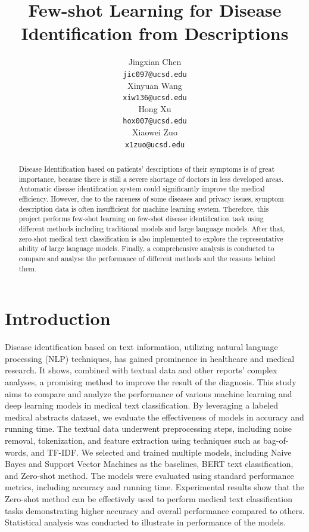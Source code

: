 \documentclass[11pt,a4paper]{article}
\title{Few-shot Learning for Disease Identification from Descriptions}
\author{Jingxian Chen \\
  {\tt jic097@ucsd.edu} \\\And
  Xinyuan Wang \\
  {\tt xiw136@ucsd.edu} \\\And
  Hong Xu \\
  {\tt hox007@ucsd.edu} \\\And
  Xiaowei Zuo \\
  {\tt x1zuo@ucsd.edu} \\}
\date{}
\begin{document}
\maketitle

\begin{abstract}
Disease Identification based on patients' descriptions of their symptoms is of great importance, because there is still a severe shortage of doctors in less developed areas. Automatic disease identification system could significantly improve the medical efficiency. However, due to the rareness of some diseases and privacy issues, symptom description data is often insufficient for machine learning system. Therefore, this project performs few-shot learning on few-shot disease identification task using different methods including traditional models and large language models. After that, zero-shot medical text classification is also implemented to explore the representative ability of large language models. Finally, a comprehensive analysis is conducted to compare and analyse the performance of different methods and the reasons behind them.
\end{abstract}

\section{Introduction}

Disease identification based on text information, utilizing natural language processing (NLP) techniques, has gained prominence in healthcare and medical research. It shows, combined with textual data and other reports' complex analyses, a promising method to improve the result of the diagnosis. This study aims to compare and analyze the performance of various machine learning and deep learning models in medical text classification. By leveraging a labeled medical abstracts dataset, we evaluate the effectiveness of models in accuracy and running time. The textual data underwent preprocessing steps, including noise removal, tokenization, and feature extraction using techniques such as bag-of-words, and TF-IDF. We selected and trained multiple models, including Naive Bayes and Support Vector Machines as the baselines, BERT text classification, and Zero-shot method. The models were evaluated using standard performance metrics, including accuracy and running time. Experimental results show that the Zero-shot method can be effectively used to perform medical text classification tasks demonstrating higher accuracy and overall performance compared to others. Statistical analysis was conducted to illustrate in performance of the models.
\end{document}
